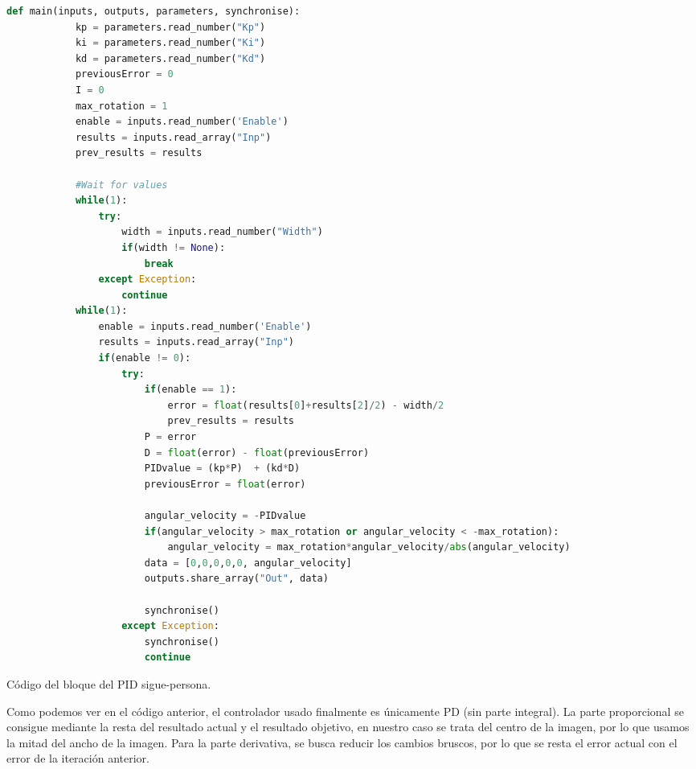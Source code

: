 \begin{code}[H]
    \begin{lstlisting}[language=python]
        def main(inputs, outputs, parameters, synchronise):
            kp = parameters.read_number("Kp")
            ki = parameters.read_number("Ki")
            kd = parameters.read_number("Kd")
            previousError = 0
            I = 0
            max_rotation = 1
            enable = inputs.read_number('Enable')
            results = inputs.read_array("Inp")
            prev_results = results
        
            #Wait for values
            while(1):
                try:
                    width = inputs.read_number("Width")
                    if(width != None):
                        break
                except Exception:
                    continue
            while(1):
                enable = inputs.read_number('Enable')
                results = inputs.read_array("Inp")
                if(enable != 0):
                    try:        
                        if(enable == 1):
                            error = float(results[0]+results[2]/2) - width/2
                            prev_results = results
                        P = error
                        D = float(error) - float(previousError)
                        PIDvalue = (kp*P)  + (kd*D)
                        previousError = float(error)

                        angular_velocity = -PIDvalue
                        if(angular_velocity > max_rotation or angular_velocity < -max_rotation):
                            angular_velocity = max_rotation*angular_velocity/abs(angular_velocity)
                        data = [0,0,0,0,0, angular_velocity]
                        outputs.share_array("Out", data)
        
                        synchronise()
                    except Exception:
                        synchronise()
                        continue
    \end{lstlisting}
    \caption[Código bloque PID sigue-persona]{Código del bloque del PID sigue-persona.}
    \label{cod:PID_follow_person}
\end{code}

\newpage
Como podemos ver en el código anterior, el controlador usado finalmente es únicamente PD (sin parte integral).
La parte proporcional se consigue mediante la resta del resultado actual y el resultado objetivo, en nuestro caso se trata del centro de la imagen,
por lo que usamos la mitad del ancho de la imagen.
Para la parte derivativa, se busca reducir los cambios bruscos, por lo que se resta el error actual con el error de la iteración anterior.\\

